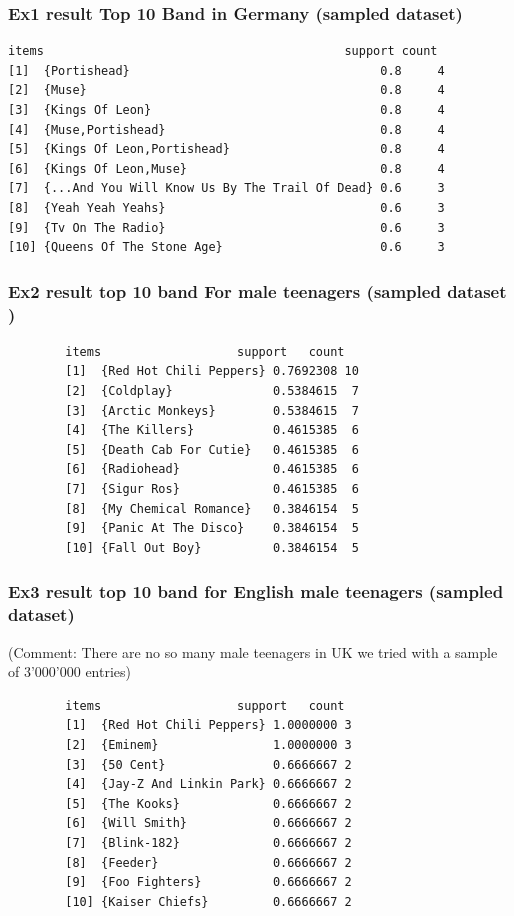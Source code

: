 \documentclass[a4paper]{article}
\begin{document}
	\subsubsection{Ex1 result Top 10 Band in Germany (sampled dataset)}
	
		\begin{lstlisting}
items                                          support count
[1]  {Portishead}                                   0.8     4    
[2]  {Muse}                                         0.8     4    
[3]  {Kings Of Leon}                                0.8     4    
[4]  {Muse,Portishead}                              0.8     4    
[5]  {Kings Of Leon,Portishead}                     0.8     4    
[6]  {Kings Of Leon,Muse}                           0.8     4    
[7]  {...And You Will Know Us By The Trail Of Dead} 0.6     3    
[8]  {Yeah Yeah Yeahs}                              0.6     3    
[9]  {Tv On The Radio}                              0.6     3    
[10] {Queens Of The Stone Age}                      0.6     3   
	\end{lstlisting}
	
	\subsubsection{Ex2 result top 10 band For male teenagers (sampled dataset )}
	
	\begin{lstlisting}
		items                   support   count
		[1]  {Red Hot Chili Peppers} 0.7692308 10   
		[2]  {Coldplay}              0.5384615  7   
		[3]  {Arctic Monkeys}        0.5384615  7   
		[4]  {The Killers}           0.4615385  6   
		[5]  {Death Cab For Cutie}   0.4615385  6   
		[6]  {Radiohead}             0.4615385  6   
		[7]  {Sigur Ros}             0.4615385  6   
		[8]  {My Chemical Romance}   0.3846154  5   
		[9]  {Panic At The Disco}    0.3846154  5   
		[10] {Fall Out Boy}          0.3846154  5 
	\end{lstlisting}
	
	\subsubsection{Ex3 result top 10 band for English male teenagers (sampled dataset)}
	(Comment: There are no so many male teenagers in UK we tried with a sample of 3'000'000 entries)
	\begin{lstlisting}
		items                   support   count
		[1]  {Red Hot Chili Peppers} 1.0000000 3    
		[2]  {Eminem}                1.0000000 3    
		[3]  {50 Cent}               0.6666667 2    
		[4]  {Jay-Z And Linkin Park} 0.6666667 2    
		[5]  {The Kooks}             0.6666667 2    
		[6]  {Will Smith}            0.6666667 2    
		[7]  {Blink-182}             0.6666667 2    
		[8]  {Feeder}                0.6666667 2    
		[9]  {Foo Fighters}          0.6666667 2    
		[10] {Kaiser Chiefs}         0.6666667 2  
	\end{lstlisting}
	
\end{document}

